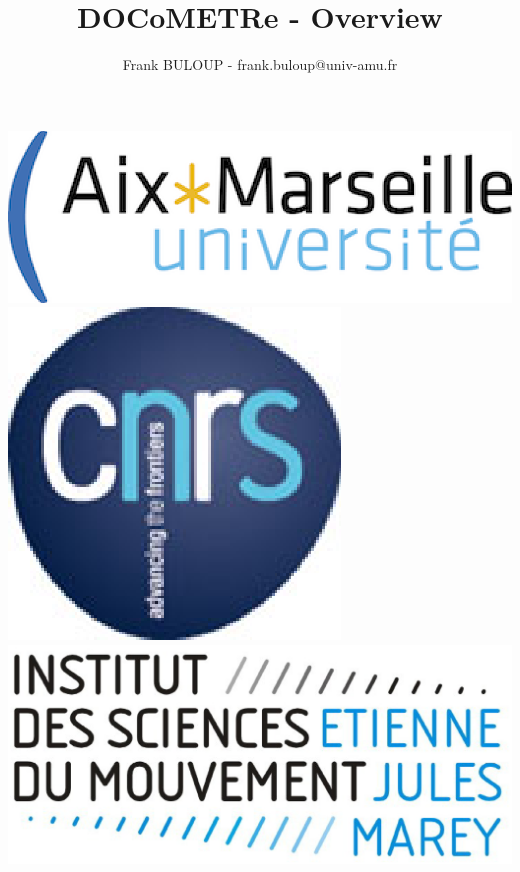 \documentclass[a4paper,11pt]{beamer}
\title{DOCoMETRe - Overview}
\author{Frank BULOUP - frank.buloup@univ-amu.fr}
\institute{Aix Marseille Université\\Institut des Sciences du Mouvement}
\date{}
\begin{document}
 

\begin{frame}[plain]
	\titlepage
	\vspace{1cm}
 
	\includegraphics[scale=0.3]{images/LogoAMU.eps}\hspace*{2cm}
	\includegraphics[scale=0.2]{images/LogoCNRS.eps}\hspace*{2cm}
	\includegraphics[scale=0.1]{images/LogoISM.eps}
\end{frame}
\end{document}
